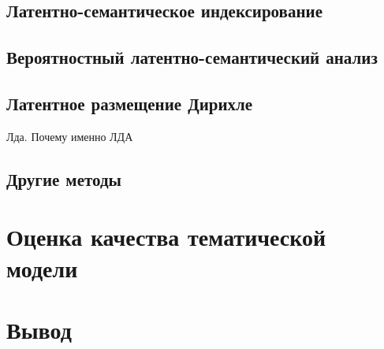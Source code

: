 \subsection{Латентно-семантическое индексирование}
\subsection{Вероятностный латентно-семантический анализ}
\subsection{Латентное размещение Дирихле}

Лда. Почему именно ЛДА

\subsection{Другие методы}


\section{Оценка качества тематической модели}
\label{sec:tm_techniques}


\section{Вывод}
\label{sec:overview_concl}

\blindtext